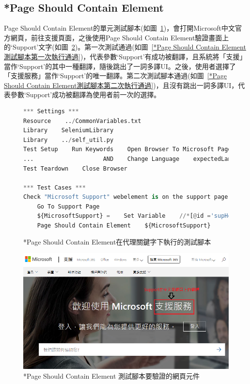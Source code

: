 \subsection{*Page Should Contain Element}
Page Should Contain Element的單元測試腳本(如圖~\ref{*Page Should Contain Element在代理關鍵字下執行的測試腳本})，會打開Microsoft中文官方網頁，前往支援頁面，之後使用Page Should Contain Element驗證畫面上的‘Support’文字(如圖~\ref{*Page Should Contain Element 測試腳本要驗證的網頁元件})。第一次測試通過(如圖~\ref{*Page Should Contain Element測試腳本第一次執行通過})，代表參數‘Support’有成功被翻譯，且系統將「支援」當作‘Support’的其中一種翻譯，隨後跳出了一詞多譯UI。之後，使用者選擇了「支援服務」當作‘Support’的唯一翻譯。第二次測試腳本通過(如圖~\ref{*Page Should Contain Element測試腳本第二次執行通過})，且沒有跳出一詞多譯UI，代表參數‘Support’成功被翻譯為使用者前一次的選擇。
\hspace*{\fill} \\
\begin{figure}[H]
\begin{lstlisting}[language={python}]
*** Settings ***
Resource    ../CommonVariables.txt
Library    SeleniumLibrary
Library    ../self_util.py
Test Setup    Run Keywords    Open Browser To Microsoft Page
...                    AND    Change Language    expectedLanguage=${language}
Test Teardown    Close Browser

*** Test Cases ***
Check "Microsoft Support" webelement is on the support page
    Go To Support Page
    ${MicrosoftSupport} =    Set Variable    //*[@id ='supHomeAndLandingPageHeaderContainer']//*[contains(text(), 'Support')]
    Page Should Contain Element    ${MicrosoftSupport}
\end{lstlisting}
\caption{*Page Should Contain Element在代理關鍵字下執行的測試腳本}
\label{*Page Should Contain Element在代理關鍵字下執行的測試腳本}
\end{figure}

\begin{figure}[H]
\centering
\includegraphics[width= .8\textwidth]{../論文截圖/4-1-9 Page should contain element要驗證的網頁元件.png}
\caption{*Page Should Contain Element 測試腳本要驗證的網頁元件\cite{microsoft}}
\label{*Page Should Contain Element 測試腳本要驗證的網頁元件}
\end{figure}

